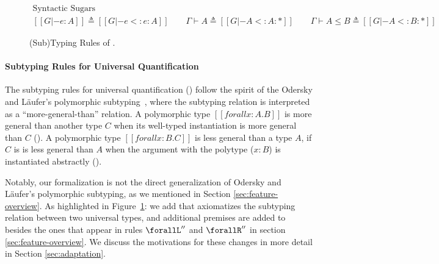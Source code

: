\begin{figure}
    \setlength{\abovedisplayskip}{0pt}
    \setlength{\abovedisplayshortskip}{0pt}
    \begin{gather*}
       \text{Syntactic Sugars} \\
       [[G |- e : A]] \triangleq [[G |- e <: e : A]]
      \qquad \Gamma \vdash A \triangleq [[G |- A <: A : *]]
      \qquad \Gamma \vdash A \le B \triangleq [[G |- A <: B : *]]
    \end{gather*}
    \caption{(Sub)Typing Rules of \name.}
    \label{fig:typing}
\end{figure}

\paragraph{Subtyping Rules for Universal Quantification}
The subtyping rules for universal quantification () follow
the spirit of the Odersky and L\"aufer's polymorphic subtyping~\citep{odersky1996putting,dunfield2013complete},
where the subtyping relation is interpreted as a ``more-general-than'' relation.
A polymorphic type $[[forall x : A. B]]$
is more general than another type $C$ when its well-typed
instantiation is more general than $C$ (). A polymorphic
type $[[forall x : B. C]]$ is less general than a type $A$,
if $C$ is is less general than $A$ when the argument with the polytype ($x:B$)
is instantiated abstractly ().

Notably, our formalization is not the direct generalization of
Odersky and L\"aufer's polymorphic subtyping, as we mentioned in Section \ref{sec:feature-overview}.
As highlighted in Figure~\ref{fig:typing}:
we add  that axiomatizes the subtyping relation between two universal types,
and additional premises are added to  besides the
ones that appear in rules $\forallL''$ and $\forallR''$ in section \ref{sec:feature-overview}.
We discuss the motivations for these changes in more detail in Section \ref{sec:adaptation}.

